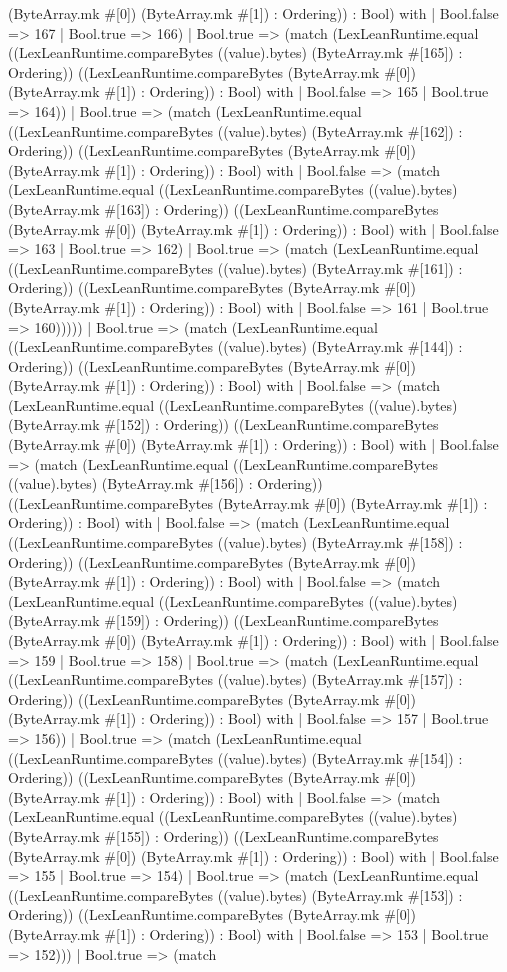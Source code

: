 \documentclass[11pt]{article}
\begin{document}
(ByteArray.mk \#[0]) (ByteArray.mk \#[1]) : Ordering)) : Bool) with | Bool.false => 167 | Bool.true => 166) | Bool.true => (match (LexLeanRuntime.equal ((LexLeanRuntime.compareBytes ((value).bytes) (ByteArray.mk \#[165]) : Ordering)) ((LexLeanRuntime.compareBytes (ByteArray.mk \#[0]) (ByteArray.mk \#[1]) : Ordering)) : Bool) with | Bool.false => 165 | Bool.true => 164)) | Bool.true => (match (LexLeanRuntime.equal ((LexLeanRuntime.compareBytes ((value).bytes) (ByteArray.mk \#[162]) : Ordering)) ((LexLeanRuntime.compareBytes (ByteArray.mk \#[0]) (ByteArray.mk \#[1]) : Ordering)) : Bool) with | Bool.false => (match (LexLeanRuntime.equal ((LexLeanRuntime.compareBytes ((value).bytes) (ByteArray.mk \#[163]) : Ordering)) ((LexLeanRuntime.compareBytes (ByteArray.mk \#[0]) (ByteArray.mk \#[1]) : Ordering)) : Bool) with | Bool.false => 163 | Bool.true => 162) | Bool.true => (match (LexLeanRuntime.equal ((LexLeanRuntime.compareBytes ((value).bytes) (ByteArray.mk \#[161]) : Ordering)) ((LexLeanRuntime.compareBytes (ByteArray.mk \#[0]) (ByteArray.mk \#[1]) : Ordering)) : Bool) with | Bool.false => 161 | Bool.true => 160))))) | Bool.true => (match (LexLeanRuntime.equal ((LexLeanRuntime.compareBytes ((value).bytes) (ByteArray.mk \#[144]) : Ordering)) ((LexLeanRuntime.compareBytes (ByteArray.mk \#[0]) (ByteArray.mk \#[1]) : Ordering)) : Bool) with | Bool.false => (match (LexLeanRuntime.equal ((LexLeanRuntime.compareBytes ((value).bytes) (ByteArray.mk \#[152]) : Ordering)) ((LexLeanRuntime.compareBytes (ByteArray.mk \#[0]) (ByteArray.mk \#[1]) : Ordering)) : Bool) with | Bool.false => (match (LexLeanRuntime.equal ((LexLeanRuntime.compareBytes ((value).bytes) (ByteArray.mk \#[156]) : Ordering)) ((LexLeanRuntime.compareBytes (ByteArray.mk \#[0]) (ByteArray.mk \#[1]) : Ordering)) : Bool) with | Bool.false => (match (LexLeanRuntime.equal ((LexLeanRuntime.compareBytes ((value).bytes) (ByteArray.mk \#[158]) : Ordering)) ((LexLeanRuntime.compareBytes (ByteArray.mk \#[0]) (ByteArray.mk \#[1]) : Ordering)) : Bool) with | Bool.false => (match (LexLeanRuntime.equal ((LexLeanRuntime.compareBytes ((value).bytes) (ByteArray.mk \#[159]) : Ordering)) ((LexLeanRuntime.compareBytes (ByteArray.mk \#[0]) (ByteArray.mk \#[1]) : Ordering)) : Bool) with | Bool.false => 159 | Bool.true => 158) | Bool.true => (match (LexLeanRuntime.equal ((LexLeanRuntime.compareBytes ((value).bytes) (ByteArray.mk \#[157]) : Ordering)) ((LexLeanRuntime.compareBytes (ByteArray.mk \#[0]) (ByteArray.mk \#[1]) : Ordering)) : Bool) with | Bool.false => 157 | Bool.true => 156)) | Bool.true => (match (LexLeanRuntime.equal ((LexLeanRuntime.compareBytes ((value).bytes) (ByteArray.mk \#[154]) : Ordering)) ((LexLeanRuntime.compareBytes (ByteArray.mk \#[0]) (ByteArray.mk \#[1]) : Ordering)) : Bool) with | Bool.false => (match (LexLeanRuntime.equal ((LexLeanRuntime.compareBytes ((value).bytes) (ByteArray.mk \#[155]) : Ordering)) ((LexLeanRuntime.compareBytes (ByteArray.mk \#[0]) (ByteArray.mk \#[1]) : Ordering)) : Bool) with | Bool.false => 155 | Bool.true => 154) | Bool.true => (match (LexLeanRuntime.equal ((LexLeanRuntime.compareBytes ((value).bytes) (ByteArray.mk \#[153]) : Ordering)) ((LexLeanRuntime.compareBytes (ByteArray.mk \#[0]) (ByteArray.mk \#[1]) : Ordering)) : Bool) with | Bool.false => 153 | Bool.true => 152))) | Bool.true => (match 
\end{document}
